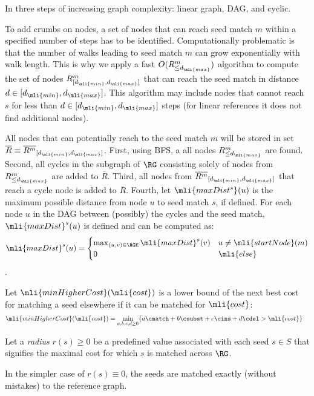 In three steps of increasing graph complexity: linear graph, DAG, and cyclic.

To add crumbs on nodes, a set of nodes that can reach seed match $m$ within a
specified number of steps has to be identified. Computationally problematic is
that the number of walks leading to seed match $m$ can grow exponentially with
walk length. This is why we apply a fast $O(R^m_{\le d_\mli{max}})$ algorithm to
compute the set of nodes $R^m_{[d_\mli{min}, d_\mli{max}]}$ that can reach the
seed match in distance $d \in [d_\mli{min}, d_\mli{max}]$. This algorithm may
include nodes that cannot reach $s$ for less than $d \in [d_\mli{min},
d_\mli{max}]$ steps (\eg for linear references it does not find additional
nodes).

All nodes that can potentially reach to the seed match $m$ will be stored in set
$\overline{R} \equiv \overline{R^m}_{[d_\mli{min},d_\mli{max}]}$. First, using
BFS, a all nodes $R^m_{\le d_\mli{max}}$ are found. Second, all cycles in the
subgraph of $\RG$ consisting solely of nodes from $R^m_{\le d_\mli{max}}$ are
added to $\overline{R}$. Third, all nodes from
$\overline{R^m}_{[d_\mli{min},d_\mli{max}]}$ that reach a cycle node is added to
$\overline{R}$. Fourth, let $\mli{maxDist^s}(u)$ is the maximum possible
distance from node $u$ to seed match $s$, if defined. For each node $u$ in the
DAG between (possibly) the cycles and the seed match, $\mli{maxDist}^s(u)$ is
defined and can be computed as:
\begin{align}
\mli{maxDist}^s(u) = 
    \begin{cases} 
        \max_{(u,v) \in \RGE}{\mli{maxDist}^s(v)} & u \neq \mli{startNode}(m) \\
        0 & \mli{else}
    \end{cases}
\end{align}.

Let $\mli{minHigherCost}(\mli{cost})$ is a lower bound of the next best cost for
matching a seed elsewhere if it can be matched for $\mli{cost}$:
\begin{align}
\mli{minHigherCost}(\mli{cost}) &= \min_{a, b, c, d \ge 0} \{ a\cmatch + b\csubst + c\cins + d\cdel > \mli{cost} \}
\end{align}

Let a \textit{radius} $r(s) \ge 0$ be a predefined value associated with each
seed \mbox{$s \in S$} that signifies the maximal cost for which $s$ is matched
across $\RG$.

In the simpler case of $r(s) \equiv 0$,
the seeds are matched exactly (without mistakes) to the reference graph.

